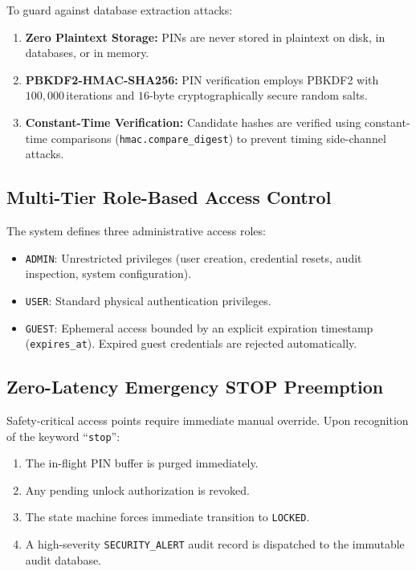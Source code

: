 \documentclass[10pt,twocolumn,letterpaper]{article}
\begin{document}
To guard against database extraction attacks:
\begin{enumerate}
    \item \textbf{Zero Plaintext Storage:} PINs are never stored in plaintext on disk, in databases, or in memory.
    \item \textbf{PBKDF2-HMAC-SHA256:} PIN verification employs PBKDF2 with $100{,}000$\,iterations and $16$-byte cryptographically secure random salts.
    \item \textbf{Constant-Time Verification:} Candidate hashes are verified using constant-time comparisons (\texttt{hmac.compare\_digest}) to prevent timing side-channel attacks.
\end{enumerate}

\subsection{Multi-Tier Role-Based Access Control}

The system defines three administrative access roles:
\begin{itemize}
    \item \texttt{ADMIN}: Unrestricted privileges (user creation, credential resets, audit inspection, system configuration).
    \item \texttt{USER}: Standard physical authentication privileges.
    \item \texttt{GUEST}: Ephemeral access bounded by an explicit expiration timestamp (\texttt{expires\_at}). Expired guest credentials are rejected automatically.
\end{itemize}

\subsection{Zero-Latency Emergency STOP Preemption}

Safety-critical access points require immediate manual override. Upon recognition of the keyword ``\texttt{stop}'':
\begin{enumerate}
    \item The in-flight PIN buffer is purged immediately.
    \item Any pending unlock authorization is revoked.
    \item The state machine forces immediate transition to \texttt{LOCKED}.
    \item A high-severity \texttt{SECURITY\_ALERT} audit record is dispatched to the immutable audit database.
\end{enumerate}
\end{document}
